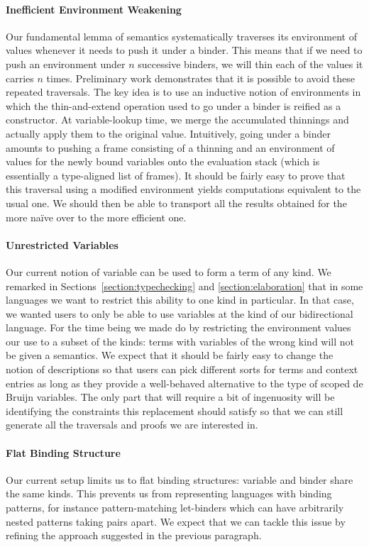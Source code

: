 \paragraph{Inefficient Environment Weakening} Our fundamental lemma of
semantics systematically traverses its environment of values whenever it
needs to push it under a binder. This means that if we need to push an
environment under $n$ successive binders, we will thin each of the values
it carries $n$ times.
%
Preliminary work demonstrates that it is possible to avoid these repeated
traversals. The key idea is to use an inductive notion of environments in
which the thin-and-extend operation used to go under a binder is reified
as a constructor. At variable-lookup time, we merge the accumulated
thinnings and actually apply them to the original value.
%
Intuitively, going under a binder amounts to pushing a frame consisting of
a thinning and an environment of values for the newly bound variables onto
the evaluation stack (which is essentially a type-aligned list of frames).
%
It should be fairly easy to prove that this traversal using a modified
environment yields computations equivalent to the usual one. We should then
be able to transport all the results obtained for the more naïve 
over to the more efficient one.

\paragraph{Unrestricted Variables} Our current notion of variable can be used
to form a term of any kind. We remarked in Sections~\ref{section:typechecking}
and \ref{section:elaboration} that in some languages we want to restrict this
ability to one kind in particular. In that case, we wanted users to only be able
to use variables at the kind  of our bidirectional language. For the
time being we made do by restricting the environment values our 
use to a subset of the kinds: terms with variables of the wrong kind will not be
given a semantics.
%
We expect that it should be fairly easy to change the notion of descriptions
so that users can pick different sorts for terms and context entries as long
as they provide a well-behaved alternative to the type  of scoped de
Bruijn variables.
%
The only part that will require a bit of ingenuosity will be identifying
the constraints this  replacement should satisfy so that we can still
generate all the traversals and proofs we are interested in.

\paragraph{Flat Binding Structure} Our current setup limits us to flat binding
structures: variable and binder share the same kinds. This prevents us from
representing languages with binding patterns, for instance pattern-matching
let-binders which can have arbitrarily nested patterns taking pairs apart.
%
We expect that we can tackle this issue by refining the approach suggested in
the previous paragraph.

